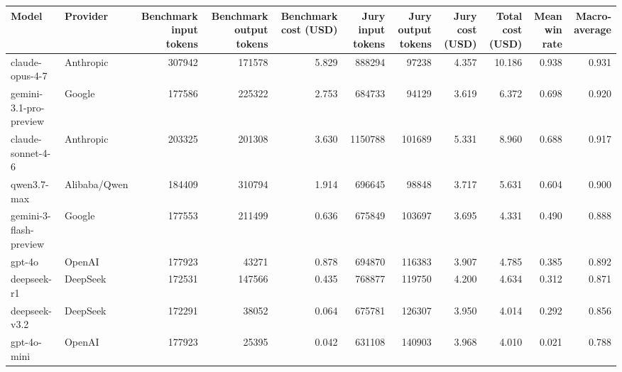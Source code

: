 \begin{tabular}{llrrrrrrrrr}
\toprule
Model & Provider & Benchmark input tokens & Benchmark output tokens & Benchmark cost (USD) & Jury input tokens & Jury output tokens & Jury cost (USD) & Total cost (USD) & Mean win rate & Macro-average \\
\midrule
claude-opus-4-7 & Anthropic & 307942 & 171578 & 5.829 & 888294 & 97238 & 4.357 & 10.186 & 0.938 & 0.931 \\
gemini-3.1-pro-preview & Google & 177586 & 225322 & 2.753 & 684733 & 94129 & 3.619 & 6.372 & 0.698 & 0.920 \\
claude-sonnet-4-6 & Anthropic & 203325 & 201308 & 3.630 & 1150788 & 101689 & 5.331 & 8.960 & 0.688 & 0.917 \\
qwen3.7-max & Alibaba/Qwen & 184409 & 310794 & 1.914 & 696645 & 98848 & 3.717 & 5.631 & 0.604 & 0.900 \\
gemini-3-flash-preview & Google & 177553 & 211499 & 0.636 & 675849 & 103697 & 3.695 & 4.331 & 0.490 & 0.888 \\
gpt-4o & OpenAI & 177923 & 43271 & 0.878 & 694870 & 116383 & 3.907 & 4.785 & 0.385 & 0.892 \\
deepseek-r1 & DeepSeek & 172531 & 147566 & 0.435 & 768877 & 119750 & 4.200 & 4.634 & 0.312 & 0.871 \\
deepseek-v3.2 & DeepSeek & 172291 & 38052 & 0.064 & 675781 & 126307 & 3.950 & 4.014 & 0.292 & 0.856 \\
gpt-4o-mini & OpenAI & 177923 & 25395 & 0.042 & 631108 & 140903 & 3.968 & 4.010 & 0.021 & 0.788 \\
\bottomrule
\end{tabular}
